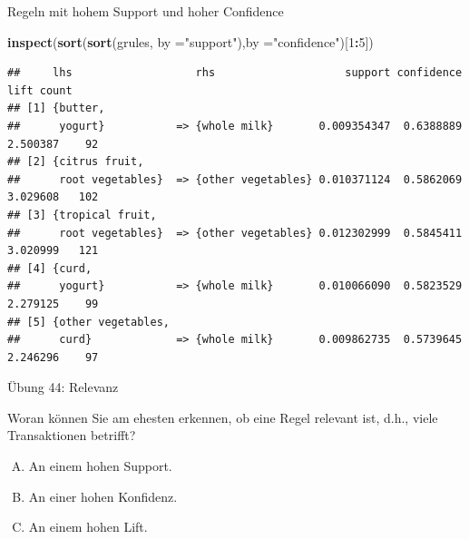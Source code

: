 \documentclass[12pt,ngerman,a4paper,ignorenonframetext,]{beamer}
\newenvironment{Shaded}{\begin{snugshade}}{\end{snugshade}}
\newcommand{\DataTypeTok}[1]{\textcolor[rgb]{0.13,0.29,0.53}{#1}}
\newcommand{\DecValTok}[1]{\textcolor[rgb]{0.00,0.00,0.81}{#1}}
\newcommand{\KeywordTok}[1]{\textcolor[rgb]{0.13,0.29,0.53}{\textbf{#1}}}
\newcommand{\NormalTok}[1]{#1}
\newcommand{\OperatorTok}[1]{\textcolor[rgb]{0.81,0.36,0.00}{\textbf{#1}}}
\newcommand{\StringTok}[1]{\textcolor[rgb]{0.31,0.60,0.02}{#1}}
\providecommand{\tightlist}{%
  \setlength{\itemsep}{0pt}\setlength{\parskip}{0pt}}
\begin{document}
\begin{frame}{Regeln mit hohem Support und hoher
Confidence}
\protect\hypertarget{regeln-mit-hohem-support-und-hoher-confidence}{}

\begin{Shaded}
\begin{Highlighting}[]
\KeywordTok{inspect}\NormalTok{(}\KeywordTok{sort}\NormalTok{(}\KeywordTok{sort}\NormalTok{(grules, }\DataTypeTok{by =}\StringTok{"support"}\NormalTok{),}\DataTypeTok{by =}\StringTok{"confidence"}\NormalTok{)[}\DecValTok{1}\OperatorTok{:}\DecValTok{5}\NormalTok{])}
\end{Highlighting}
\end{Shaded}

\begin{verbatim}
##     lhs                   rhs                    support confidence     lift count
## [1] {butter,                                                                      
##      yogurt}           => {whole milk}       0.009354347  0.6388889 2.500387    92
## [2] {citrus fruit,                                                                
##      root vegetables}  => {other vegetables} 0.010371124  0.5862069 3.029608   102
## [3] {tropical fruit,                                                              
##      root vegetables}  => {other vegetables} 0.012302999  0.5845411 3.020999   121
## [4] {curd,                                                                        
##      yogurt}           => {whole milk}       0.010066090  0.5823529 2.279125    99
## [5] {other vegetables,                                                            
##      curd}             => {whole milk}       0.009862735  0.5739645 2.246296    97
\end{verbatim}

\end{frame}

\begin{frame}{Übung 44: Relevanz}
\protect\hypertarget{ubung-44-relevanz}{}

Woran können Sie am ehesten erkennen, ob eine Regel relevant ist,
\mbox{d.\thinspace{}h.,}\xspace{} viele Transaktionen betrifft?

\begin{enumerate}
[A.]
\tightlist
\item
  An einem hohen Support.
\item
  An einer hohen Konfidenz.
\item
  An einem hohen Lift.
\end{enumerate}


\end{frame}
\end{document}
